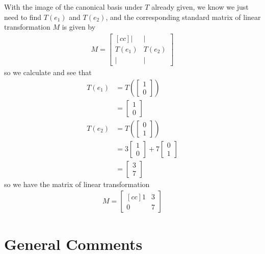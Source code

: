 \documentclass{amsart}
\theoremstyle{definition}
\theoremstyle{definition}
\DeclareMathOperator{\1}{\mathbbm{1}}
\begin{document}
\begin{enumerate}[itemsep = 1.5mm]
	With the image of the canonical basis under $T$ already given, we know we just need to find $T(e_1)$ and $T(e_2)$, and the corresponding standard matrix of linear transformation $M$ is given by
	\begin{align*}
	M = \begin{bmatrix}[c c]
	| & | \\ T(e_1) & T(e_2) \\ | & |
	\end{bmatrix}
	\end{align*}
	so we calculate and see that
	\begin{align}
	\nonumber T(e_1) &= T\left( \begin{bmatrix} 1 \\ 0 \end{bmatrix} \right) \\
	\label{eq3} \tag{$\star \star$} &= \begin{bmatrix} 1 \\ 0 \end{bmatrix} \\
	\nonumber T(e_2) &= T\left( \begin{bmatrix} 0 \\ 1 \end{bmatrix} \right) \\
	\nonumber &= 3 \begin{bmatrix} 1 \\ 0 \end{bmatrix} + 7 \begin{bmatrix} 0 \\ 1 \end{bmatrix} \\
	\label{eq4} \tag{$\ast \ast$} &= \begin{bmatrix} 3 \\ 7 \end{bmatrix}
	\end{align}
	so we have the matrix of linear transformation
	\begin{align}
	\label{eq5}
	\tag{$\dagger$}
	M = \begin{bmatrix}[c c]
	1 & 3 \\ 0 & 7
	\end{bmatrix}
	\end{align}
\end{enumerate}


\clearpage

\section*{General Comments}
\end{document}
